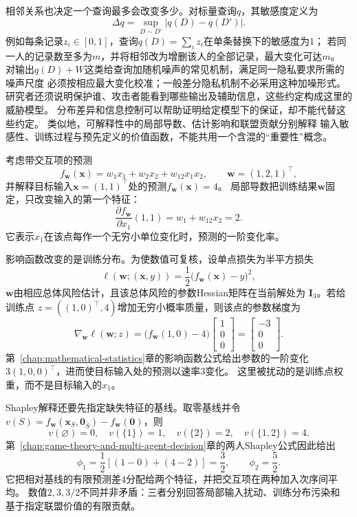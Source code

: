 相邻关系也决定一个查询最多会改变多少。对标量查询$q$，其敏感度定义为
\[
 \Delta q=\sup_{D\sim D'}|q(D)-q(D')|.
\]
例如每条记录$z_i\in[0,1]$，查询$q(D)=\sum_i z_i$在单条替换下的敏感度为$1$；
若同一人的记录数至多为$m$，并将相邻改为增删该人的全部记录，最大变化可达$m$。
对输出$q(D)+W$这类给查询加随机噪声的常见机制，满足同一隐私要求所需的噪声尺度
必须按相应最大变化校准；一般差分隐私机制不必采用这种加噪形式。
研究者还须说明保护谁、攻击者能看到哪些输出及辅助信息，这些约定构成这里的威胁模型。
分布差异和信息控制可以帮助证明给定模型下的保证，却不能代替这些约定。
类似地，可解释性中的局部导数、估计影响和联盟贡献分别解释
输入敏感性、训练过程与预先定义的价值函数，不能共用一个含混的“重要性”概念。

\begin{example}[同一预测上的三种解释对象]
  \label{ex:future-explanation-three-objects}
  考虑带交互项的预测
  \[
    f_{\bm w}(\bm x)
    =
    w_1x_1+w_2x_2+w_{12}x_1x_2,
    \qquad
    \bm w=(1,2,1)^{\top},
  \]
  并解释目标输入\(\bm x=(1,1)^{\top}\)处的预测\(f_{\bm w}(\bm x)=4\)。
  局部导数把训练结果\(\bm w\)固定，只改变输入的第一个特征：
  \[
    \frac{\partial f_{\bm w}}{\partial x_1}(1,1)
    =
    w_1+w_{12}x_2
    =
    2.
  \]
  它表示\(x_1\)在该点每作一个无穷小单位变化时，预测的一阶变化率。

  影响函数改变的是训练分布。为使数值可复核，设单点损失为半平方损失
  \[
    \ell(\bm w;(\bm x,y))
    =
    \frac12\bigl(f_{\bm w}(\bm x)-y\bigr)^2,
  \]
  \(\bm w\)由相应总体风险估计，且该总体风险的参数Hessian矩阵在当前解处为
  \(\bm I_3\)。若给训练点
  \(z=((1,0)^{\top},4)\)增加无穷小概率质量，则该点的参数梯度为
  \[
    \nabla_{\bm w}\ell(\bm w;z)
    =
    \bigl(f_{\bm w}(1,0)-4\bigr)
    \begin{bmatrix}1\\0\\0\end{bmatrix}
    =
    \begin{bmatrix}-3\\0\\0\end{bmatrix}.
  \]
  第~\ref{chap:mathematical-statistics}章的影响函数公式给出参数的一阶变化
  \(3(1,0,0)^{\top}\)，进而使目标输入处的预测以速率\(3\)变化。
  这里被扰动的是训练点权重，而不是目标输入的\(x_1\)。

  Shapley解释还要先指定缺失特征的基线。取零基线并令
  \(v(S)=f_{\bm w}(\bm x_S,\bm0_{\bar S})-f_{\bm w}(\bm0)\)，则
  \[
    v(\varnothing)=0,\quad
    v(\{1\})=1,\quad
    v(\{2\})=2,\quad
    v(\{1,2\})=4.
  \]
  第~\ref{chap:game-theory-and-multi-agent-decision}章的两人Shapley公式因此给出
  \[
    \phi_1
    =
    \frac12[(1-0)+(4-2)]
    =
    \frac32,
    \qquad
    \phi_2=\frac52.
  \]
  它把相对基线的有限预测差\(4\)分配给两个特征，并把交互项在两种加入次序间平均。
  数值\(2,3,3/2\)不同并非矛盾：三者分别回答局部输入扰动、训练分布污染和
  基于指定联盟价值的有限贡献。
\end{example}

